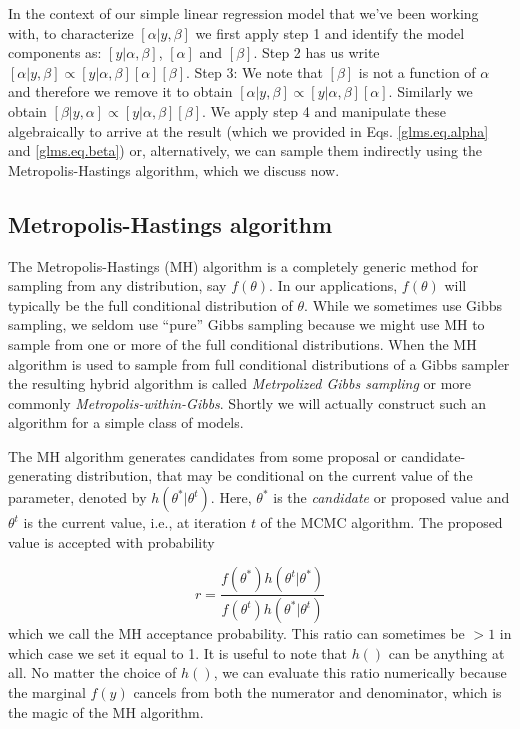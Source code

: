 In the context of our simple linear regression model that we've been 
working with, to characterize $[\alpha|y,\beta]$ we first apply step 1
and identify the model components as: $[y|\alpha, \beta]$, $[\alpha]$
and $[\beta]$. Step 2 has us write $[\alpha|y,\beta] \propto
[y|\alpha,\beta][\alpha][\beta]$.  Step 3: We note that $[\beta]$ is not a
function of $\alpha$ and therefore we remove it to obtain $[\alpha|y,\beta]
\propto [y|\alpha,\beta][\alpha]$. Similarly we obtain $[\beta|y,\alpha]
\propto [y|\alpha,\beta][\beta]$. We apply step 4 and manipulate
these algebraically to arrive at the result (which we provided in
Eqs. \ref{glms.eq.alpha} and \ref{glms.eq.beta}) or, alternatively, we can
sample them indirectly using the Metropolis-Hastings algorithm, which we 
discuss now.


\subsection{Metropolis-Hastings algorithm}

The Metropolis-Hastings (MH) algorithm is a completely generic method for
sampling from any distribution, say $f(\theta)$. In our applications,
$f(\theta)$ will typically be the full conditional distribution of
$\theta$.
While we sometimes use Gibbs sampling, we seldom
use ``pure'' Gibbs sampling because we might use MH to sample from one
or more of the full conditional distributions.
When the MH algorithm is used to sample from  full
conditional distributions of a Gibbs sampler the resulting hybrid algorithm is
called
 {\it Metrpolized Gibbs sampling} or
more commonly {\it Metropolis-within-Gibbs}.
Shortly we will
actually construct such an algorithm for a simple class of models.

The MH algorithm generates candidates from some
proposal or candidate-generating distribution, that may be conditional
on the current value of the parameter, denoted by
$h(\theta^{*}|\theta^{t})$. Here, $\theta^{*}$ is the {\it candidate}
or proposed
value and $\theta^{t}$ is the current value, i.e., at iteration $t$ of
the MCMC algorithm.  The proposed value
is accepted with probability

\[
r = \frac{ f(\theta^{*}) h(\theta^{t}|\theta^{*})}
    {f(\theta^{t}) h(\theta^{*}|\theta^{t}) }
\]
which we call the MH acceptance probability.
This ratio can sometimes be $>1$ in which case we set it equal to
1. It is useful to note that $h()$ can be anything at all. No matter
the choice of $h()$, we can evaluate this ratio numerically because
the marginal $f(y)$ cancels from both the numerator and
denominator, which is the magic of the MH algorithm.


